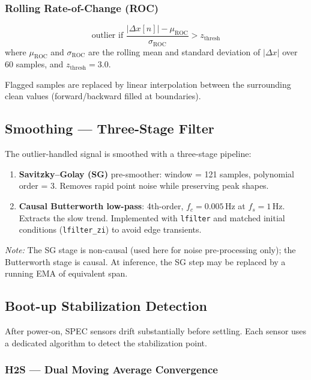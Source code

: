 \documentclass[11pt,a4paper]{article}
\begin{document}
\subsubsection*{Rolling Rate-of-Change (ROC)}
\[
  \text{outlier if } \frac{|\Delta x[n]| - \mu_{\text{ROC}}}{\sigma_{\text{ROC}}} > z_{\text{thresh}}
\]
where $\mu_{\text{ROC}}$ and $\sigma_{\text{ROC}}$ are the rolling mean and
standard deviation of $|\Delta x|$ over 60 samples, and $z_{\text{thresh}} = 3.0$.

Flagged samples are replaced by linear interpolation between the surrounding
clean values (forward/backward filled at boundaries).

\subsection{Smoothing --- Three-Stage Filter}

The outlier-handled signal is smoothed with a three-stage pipeline:

\begin{enumerate}
  \item \textbf{Savitzky--Golay (SG)} pre-smoother:
        window = 121 samples, polynomial order = 3.
        Removes rapid point noise while preserving peak shapes.

  \item \textbf{Causal Butterworth low-pass}:
        4th-order, $f_c = 0.005$\,Hz at $f_s = 1$\,Hz.
        Extracts the slow trend.  Implemented with \texttt{lfilter} and
        matched initial conditions (\texttt{lfilter\_zi}) to avoid edge
        transients.
\end{enumerate}

\noindent\textit{Note:} The SG stage is non-causal (used here for noise
pre-processing only); the Butterworth stage is causal.  At inference,
the SG step may be replaced by a running EMA of equivalent span.

\subsection{Boot-up Stabilization Detection}

After power-on, SPEC sensors drift substantially before settling.  Each sensor
uses a dedicated algorithm to detect the stabilization point.

\subsubsection*{H2S --- Dual Moving Average Convergence}
\end{document}
